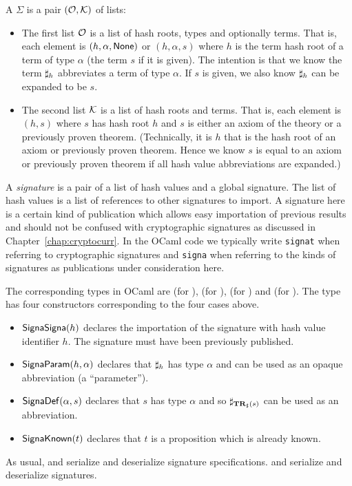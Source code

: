 A {} $\Sigma$ is a pair $(\mathcal{O},\mathcal{K})$ of lists:
\begin{itemize}
\item The first list $\mathcal{O}$ is a list of hash roots, types and optionally terms.
      That is, each element is $(h,\alpha,{\mbox{\val{None}}})$ or $(h,\alpha,s)$
      where $h$ is the term hash root of a term of type $\alpha$ (the term $s$ if it is given).
      The intention is that we know the term $\mathbf{\sharp}_{h}$ abbreviates a term of type $\alpha$.
      If $s$ is given, we also know $\mathbf{\sharp}_{h}$ can be expanded to be $s$.
\item The second list $\mathcal{K}$ is a list of hash roots and terms.
      That is, each element is $(h,s)$ where $s$ has hash root $h$
      and $s$ is either an axiom of the theory or a previously proven theorem.
      (Technically, it is $h$ that is the hash root of an axiom or previously proven theorem.
      Hence we know $s$ is equal to an axiom or previously proven theorem if all hash value
      abbreviations are expanded.)
\end{itemize}
A {\emph{signature}} is a pair of a list of hash values and a global signature.
The list of hash values is a list of references to other signatures to import.
A signature here is a certain kind of publication which allows
easy importation of previous results
and should not be confused with cryptographic signatures as discussed in Chapter~\ref{chap:cryptocurr}.
In the OCaml code we typically write {\tt{signat}} when referring to cryptographic signatures
and {\tt{signa}} when referring to the kinds of signatures as publications under consideration here.

The corresponding types in OCaml are
{} (for {}),
{} (for {}),
{} (for {}) and
{} (for {}).
The type {} has four constructors corresponding to the four cases above.
\begin{itemize}
\item $\mbox{\constr{SignaSigna}}(h)$ declares the importation of the signature with hash value identifier $h$.
The signature must have been previously published.
\item $\mbox{\constr{SignaParam}}(h,\alpha)$ declares that $\mathbf{\sharp}_{h}$ has type $\alpha$ and can be used
as an opaque abbreviation (a ``parameter'').
\item $\mbox{\constr{SignaDef}}(\alpha,s)$ declares that $s$ has type $\alpha$ and so $\mathbf{\sharp}_{\mathbf{TR}_{\sharp}(s)}$ can
be used as an abbreviation.
\item $\mbox{\constr{SignaKnown}}(t)$ declares that $t$ is a proposition which is already known.
\end{itemize}
As usual,
{} and {} serialize and deserialize signature specifications.
{} and {} serialize and deserialize signatures.

